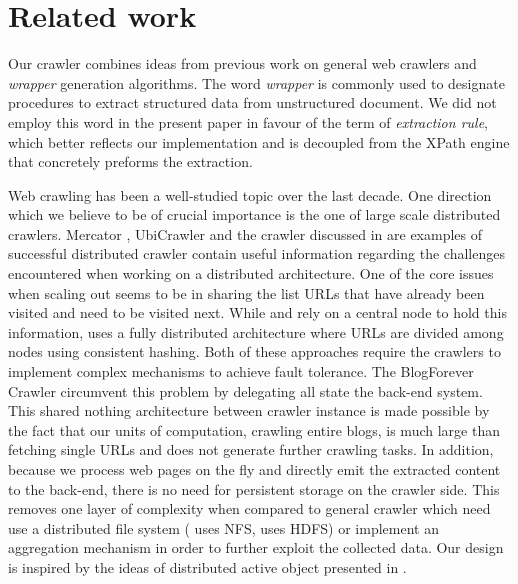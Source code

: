 \section{Related work}
\label{relatedwork}

Our crawler combines ideas from previous work on general web crawlers and \emph{wrapper} generation algorithms. The word \emph{wrapper} is commonly used to designate procedures to extract structured data from unstructured document. We did not employ this word in the present paper in favour of the term of \emph{extraction rule}, which better reflects our implementation and is decoupled from the XPath engine that concretely preforms the extraction.

Web crawling has been a well-studied topic over the last decade. One direction which we believe to be of crucial importance is the one of large scale distributed crawlers. Mercator \cite{heydon99mercator}, UbiCrawler \cite{boldi2003} and the crawler discussed in \cite{shkapenyuk2002} are examples of successful distributed crawler contain useful information regarding the challenges encountered when working on a distributed architecture. One of the core issues when scaling out seems to be in sharing the list URLs that have already been visited and need to be visited next. While \cite{heydon99mercator} and \cite{shkapenyuk2002} rely on a central node to hold this information, \cite{boldi2003} uses a fully distributed architecture where URLs are divided among nodes using consistent hashing. Both of these approaches require the crawlers to implement complex mechanisms to achieve fault tolerance. The BlogForever Crawler circumvent this problem by delegating all state the back-end system. This shared nothing architecture between crawler instance is made possible by the fact that our units of computation, crawling entire blogs, is much large than fetching single URLs and does not generate further crawling tasks. In addition, because we process web pages on the fly and directly emit the extracted content to the back-end, there is no need for persistent storage on the crawler side. This removes one layer of complexity when compared to general crawler which need use a distributed file system (\cite{shkapenyuk2002} uses NFS, \cite{berger2011} uses HDFS) or implement an aggregation mechanism in order to further exploit the collected data. Our design is inspired by the ideas of distributed active object presented in \cite{activeobject1996}.

